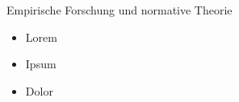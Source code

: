 \documentclass[xcolor=table,9pt,aspectratio=169]{beamer}
\begin{document}
\begin{frame}{\vspace*{10mm}Empirische Forschung und normative Theorie}
\begin{multicols}{2}
\begin{itemize}
   \item Lorem
   \item Ipsum
   \item Dolor
\end{itemize}
\vfill

\begin{center}
   \vspace{1cm}
   \vspace{1cm}
\end{center}
\end{multicols}
\end{frame}
\end{document}
